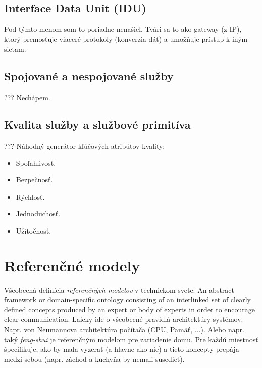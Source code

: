 \documentclass[10pt,a4paper]{article}
\begin{document}
\subsection{Interface Data Unit (IDU)}       
Pod týmto menom som to poriadne nenašiel. 
Tvári sa to ako gateway (z IP), ktorý premosťuje viaceré protokoly (konverzia dát) a 
umožňuje prístup k iným sieťam. 
      
\subsection{Spojované a nespojované služby}  
???
Nechápem. 


\subsection{Kvalita služby a službové primitíva}   
???
Náhodný generátor kľúčových atribútov kvality:
\begin{itemize}
\item Spoľahlivosť.
\item Bezpečnosť.
\item Rýchlosť.
\item Jednoduchosť.
\item Užitočnosť.
\end{itemize}
         
\section{Referenčné modely}   
\label{reference_model}   
Všeobecná definícia \emph{referenčných modelov} v technickom svete: An abstract framework or domain-specific ontology consisting of an interlinked set of clearly defined concepts produced by an expert or body of experts in order to encourage clear communication. 
Laicky ide o všeobecné pravidlá architektúry systémov. Napr. \href{http://en.wikipedia.org/wiki/Von_Neumann_architecture}{von Neumannova architektúra} počítača (CPU, Pamäť, ...). Alebo napr. taký \emph{feng-shui} je referenčným modelom pre zariadenie domu. Pre každú miestnosť špecifikuje, ako by mala vyzerať (a hlavne ako nie) a tieto koncepty prepája medzi sebou (napr. záchod a kuchyňa by nemali susedieť). 
     
\end{document}
